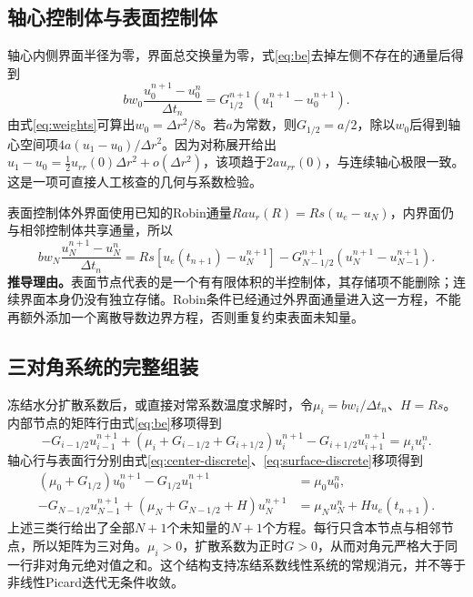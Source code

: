 \documentclass[UTF8,a4paper,zihao=-4,fontset=none]{ctexart}
\numberwithin{equation}{section}
\newcommand{\reason}[1]{\textbf{推导理由。}#1\par}
\begin{document}
\subsection{轴心控制体与表面控制体}
轴心内侧界面半径为零，界面总交换量为零，式\eqref{eq:be}去掉左侧不存在的通量后得到
\begin{equation}
bw_0\frac{u_0^{n+1}-u_0^n}{\Delta t_n}
=G_{1/2}^{n+1}(u_1^{n+1}-u_0^{n+1}).
\label{eq:center-discrete}
\end{equation}
由式\eqref{eq:weights}可算出$w_0=\Delta r^2/8$。若$a$为常数，则$G_{1/2}=a/2$，除以$w_0$后得到轴心空间项$4a(u_1-u_0)/\Delta r^2$。因为对称展开给出$u_1-u_0=\tfrac12u_{rr}(0)\Delta r^2+o(\Delta r^2)$，该项趋于$2a u_{rr}(0)$，与连续轴心极限一致。这是一项可直接人工核查的几何与系数检验。

表面控制体外界面使用已知的Robin通量$Ra u_r(R)=Rs(u_e-u_N)$，内界面仍与相邻控制体共享通量，所以
\begin{equation}
bw_N\frac{u_N^{n+1}-u_N^n}{\Delta t_n}
=Rs[u_e(t_{n+1})-u_N^{n+1}]
-G_{N-1/2}^{n+1}(u_N^{n+1}-u_{N-1}^{n+1}).
\label{eq:surface-discrete}
\end{equation}
\reason{表面节点代表的是一个有有限体积的半控制体，其存储项不能删除；连续界面本身仍没有独立存储。Robin条件已经通过外界面通量进入这一方程，不能再额外添加一个离散导数边界方程，否则重复约束表面未知量。}

\subsection{三对角系统的完整组装}
冻结水分扩散系数后，或直接对常系数温度求解时，令$\mu_i=bw_i/\Delta t_n$、$H=Rs$。内部节点的矩阵行由式\eqref{eq:be}移项得到
\begin{equation}
-G_{i-1/2}u_{i-1}^{n+1}
+(\mu_i+G_{i-1/2}+G_{i+1/2})u_i^{n+1}
-G_{i+1/2}u_{i+1}^{n+1}
=\mu_i u_i^n.
\label{eq:matrix-interior}
\end{equation}
轴心行与表面行分别由式\eqref{eq:center-discrete}、\eqref{eq:surface-discrete}移项得到
\begin{equation}
\begin{aligned}
(\mu_0+G_{1/2})u_0^{n+1}-G_{1/2}u_1^{n+1}&=\mu_0u_0^n,\\
-G_{N-1/2}u_{N-1}^{n+1}
+(\mu_N+G_{N-1/2}+H)u_N^{n+1}
&=\mu_Nu_N^n+Hu_e(t_{n+1}).
\end{aligned}
\label{eq:matrix-endpoints}
\end{equation}
上述三类行给出了全部$N+1$个未知量的$N+1$个方程。每行只含本节点与相邻节点，所以矩阵为三对角。$\mu_i>0$，扩散系数为正时$G>0$，从而对角元严格大于同一行非对角元绝对值之和。这个结构支持冻结系数线性系统的常规消元，并不等于非线性Picard迭代无条件收敛。
\end{document}

